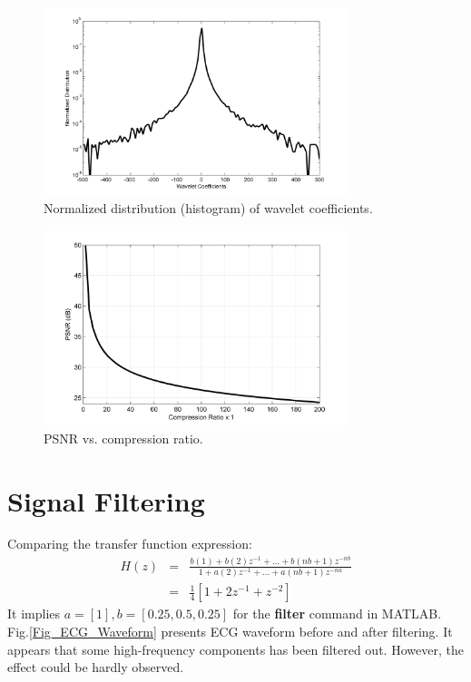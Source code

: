 \documentclass[11pt]{article}
\begin{document}
\begin{figure}[H]
	\centering
	\includegraphics[trim=1in 0.1in 1in 0in, width=3.5in]{Fig_WaveletCoeff_Hist.png}
	\caption{Normalized distribution (histogram) of wavelet coefficients.}
	\label{Fig_WaveletCoeff_Hist}
\end{figure}

\begin{figure}[H]
	\centering
	\includegraphics[trim=1in 0.1in 1in 0in, width=3.5in]{Fig_PSNR_ComprRatio.png}
	\caption{PSNR vs. compression ratio.}
	\label{Fig_PSNR_ComprRatio}
\end{figure}

\section{Signal Filtering}
Comparing the transfer function expression:
\begin{eqnarray*}
H(z) &=& \frac{b(1)+b(2)z^{-1}+...+b(nb+1)z^{-nb}}{1+a(2)z^{-1}+...+a(nb+1)z^{-na}} \\
	&=& \frac{1}{4}[1+2z^{-1}+z^{-2}]
\end{eqnarray*}
It implies $a = [1], b = [0.25, 0.5, 0.25]$ for the \textbf{filter} command in MATLAB. Fig.\ref{Fig_ECG_Waveform} presents ECG waveform before and after filtering. It appears that some high-frequency components has been filtered out. However, the effect could be hardly observed.
\end{document}
